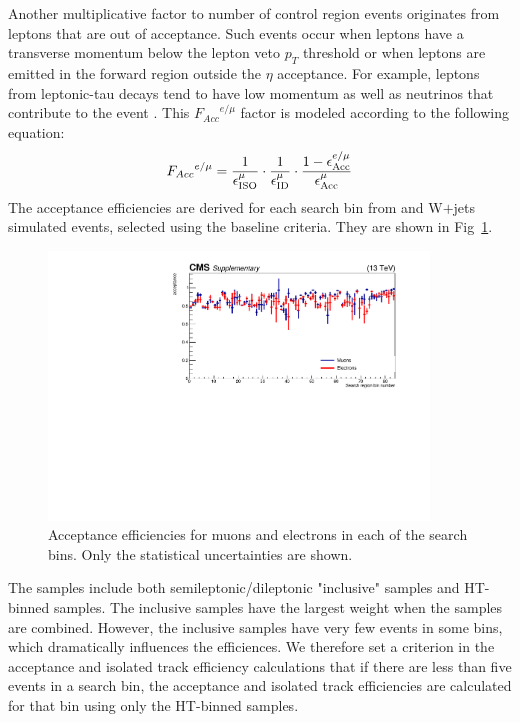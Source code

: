 Another multiplicative factor to number of control region events originates from leptons that 
are out of acceptance. Such events occur when leptons have a transverse 
momentum below the lepton veto $p_{T}$ threshold or when leptons are emitted in 
the forward region outside the $\eta$ acceptance. %
For example, leptons from leptonic-tau decays tend to have low 
momentum as well as neutrinos that contribute to the event \MET. 
This ${F_{Acc}}^{e/\mu}$ factor is modeled according to the following equation:
\begin{equation}
{F_{Acc}}^{e/\mu} = \frac{1}{\epsilon_{\rm ISO}^{\mu}}\cdot \frac{1}{\epsilon_{\rm ID}^{\mu}}  \cdot \frac{1 - \epsilon^{e/\mu}_{\rm Acc}}{\epsilon^{\mu}_{\rm Acc}}
\label{eq:accept}
\end{equation}
The acceptance efficiencies are derived for each search bin 
from \ttbar and W$+$jets simulated events,
selected using the baseline criteria. 
They are shown in Fig~\ref{fig:acceptance}.

\begin{figure}[hptb]
\begin{center}
\includegraphics[width=0.9\textwidth]{sections/mc4/Backgrounds/LostLepton/figures/v2_acc_eff_84bins.pdf}%
\end{center}
\caption{Acceptance efficiencies for muons and electrons in each of the
search bins. Only the statistical uncertainties are shown.}
\label{fig:acceptance}
\end{figure}

The \ttbar samples include both semileptonic/dileptonic "inclusive" samples and HT-binned samples.
The \ttbar inclusive samples have the largest weight when the samples are combined.
However, the \ttbar inclusive samples have very few events in some bins, which dramatically influences the efficiences.
We therefore set a criterion in the acceptance and isolated track efficiency calculations that if there are less than five events in a search bin, the acceptance and isolated track efficiencies are calculated for that bin using only the HT-binned samples.

